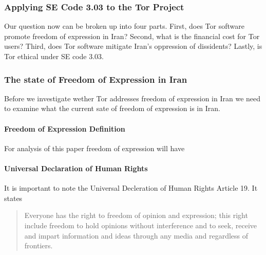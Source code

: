 \documentclass[11pt]{article}
\begin{document}
\begin{multicols}{2}

\subsubsection{Applying SE Code 3.03 to the Tor Project}

\newline

Our question now can be broken up into four parts. First, does Tor software
promote freedom of expression in Iran? Second, what is the financial cost for
Tor users?  Third, does Tor software mitigate Iran's oppression of dissidents?
Lastly, is Tor ethical under SE code 3.03.

\subsubsection{The state of Freedom of Expression in Iran}
Before we investigate wether Tor addresses freedom of expression in Iran we need
to examine what the current sate of freedom of expression is in Iran. 

\paragraph{Freedom of Expression Definition}
For analysis of this paper freedom of expression will have 

\paragraph{Universal Declaration of Human Rights}
\newline

It is important to note the Universal Decleration of Human Rights Article 19.
It states 

\begin{quotation}
  Everyone has the right to freedom of opinion and expression; this right
  include freedom to hold opinions without interference and to seek, receive and
  impart information and ideas through any media and regardless of frontiers.
\end{quotation}



\end{multicols}
\end{document}

